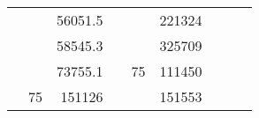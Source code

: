 \begin{table}[H]
\begin{tabular}{|ccrccrccc}
\multicolumn{1}{|c|}{\cellcolor[HTML]{FFFFC7}}                                & \multicolumn{1}{c|}{\cellcolor[HTML]{DAE8FC}}                      & \multicolumn{1}{r|}{\cellcolor[HTML]{DAE8FC}56051.5}   & \multicolumn{1}{c|}{\cellcolor[HTML]{FFFFC7}}                                & \multicolumn{1}{c|}{\cellcolor[HTML]{DAE8FC}}                       & \multicolumn{1}{r|}{\cellcolor[HTML]{DDFDFF}221324}    &                                                                              &                                                                    &                                                        \\ \cline{3-3} \cline{6-6}
\multicolumn{1}{|c|}{\cellcolor[HTML]{FFFFC7}}                                & \multicolumn{1}{c|}{\cellcolor[HTML]{DAE8FC}}                      & \multicolumn{1}{r|}{\cellcolor[HTML]{DDFDFF}58545.3}   & \multicolumn{1}{c|}{\cellcolor[HTML]{FFFFC7}}                                & \multicolumn{1}{c|}{\cellcolor[HTML]{DAE8FC}}                       & \multicolumn{1}{r|}{\cellcolor[HTML]{DAE8FC}325709}    &                                                                              &                                                                    &                                                        \\ \cline{3-3} \cline{6-6}
\multicolumn{1}{|c|}{\cellcolor[HTML]{FFFFC7}}                                & \multicolumn{1}{c|}{\cellcolor[HTML]{DAE8FC}}                      & \multicolumn{1}{r|}{\cellcolor[HTML]{DAE8FC}73755.1}   & \multicolumn{1}{c|}{\cellcolor[HTML]{FFFFC7}}                                & \multicolumn{1}{c|}{\multirow{-10}{*}{\cellcolor[HTML]{DAE8FC}75}}  & \multicolumn{1}{r|}{\cellcolor[HTML]{DDFDFF}111450}    &                                                                              &                                                                    &                                                        \\ \cline{3-3} \cline{5-6}
\multicolumn{1}{|c|}{\cellcolor[HTML]{FFFFC7}}                                & \multicolumn{1}{c|}{\multirow{-10}{*}{\cellcolor[HTML]{DAE8FC}75}} & \multicolumn{1}{r|}{\cellcolor[HTML]{DDFDFF}151126}    & \multicolumn{1}{c|}{\cellcolor[HTML]{FFFFC7}}                                & \multicolumn{1}{c|}{\cellcolor[HTML]{DDFDFF}}                       & \multicolumn{1}{r|}{\cellcolor[HTML]{DAE8FC}151553}    &                                                                              &                                                                    &                                                        \\ \cline{2-3} \cline{6-6}

\end{tabular}
\end{table}
